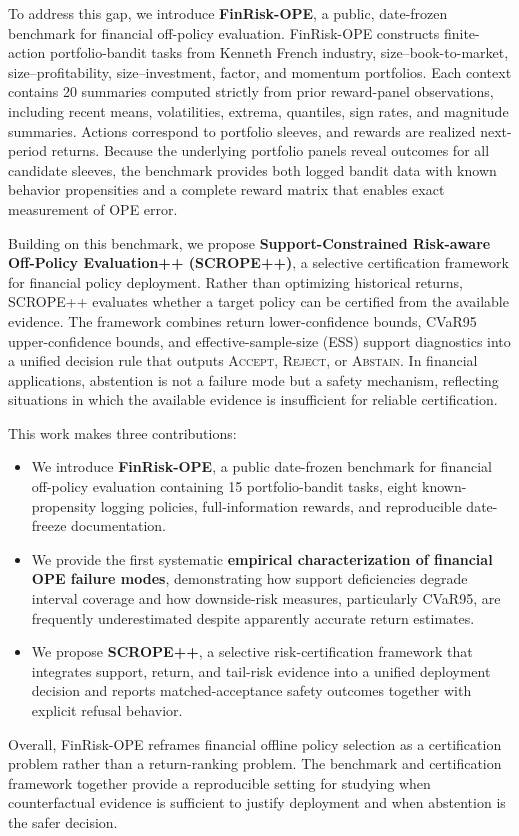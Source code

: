 \documentclass[conference]{IEEEtran}
\begin{document}
To address this gap, we introduce \textbf{FinRisk-OPE}, a public, date-frozen benchmark for financial off-policy evaluation. FinRisk-OPE constructs finite-action portfolio-bandit tasks from Kenneth French industry, size--book-to-market, size--profitability, size--investment, factor, and momentum portfolios. Each context contains 20 summaries computed strictly from prior reward-panel observations, including recent means, volatilities, extrema, quantiles, sign rates, and magnitude summaries. Actions correspond to portfolio sleeves, and rewards are realized next-period returns. Because the underlying portfolio panels reveal outcomes for all candidate sleeves, the benchmark provides both logged bandit data with known behavior propensities and a complete reward matrix that enables exact measurement of OPE error.

Building on this benchmark, we propose \textbf{Support-Constrained Risk-aware Off-Policy Evaluation++ (SCROPE++)}, a selective certification framework for financial policy deployment. Rather than optimizing historical returns, SCROPE++ evaluates whether a target policy can be certified from the available evidence. The framework combines return lower-confidence bounds, CVaR95 upper-confidence bounds, and effective-sample-size (ESS) support diagnostics into a unified decision rule that outputs \textsc{Accept}, \textsc{Reject}, or \textsc{Abstain}. In financial applications, abstention is not a failure mode but a safety mechanism, reflecting situations in which the available evidence is insufficient for reliable certification.

This work makes three contributions:

\begin{itemize}
\item We introduce \textbf{FinRisk-OPE}, a public date-frozen benchmark for financial off-policy evaluation containing 15 portfolio-bandit tasks, eight known-propensity logging policies, full-information rewards, and reproducible date-freeze documentation.
\item We provide the first systematic \textbf{empirical characterization of financial OPE failure modes}, demonstrating how support deficiencies degrade interval coverage and how downside-risk measures, particularly CVaR95, are frequently underestimated despite apparently accurate return estimates.

\item We propose \textbf{SCROPE++}, a selective risk-certification framework that integrates support, return, and tail-risk evidence into a unified deployment decision and reports matched-acceptance safety outcomes together with explicit refusal behavior.

\end{itemize}
Overall, FinRisk-OPE reframes financial offline policy selection as a certification problem rather than a return-ranking problem. The benchmark and certification framework together provide a reproducible setting for studying when counterfactual evidence is sufficient to justify deployment and when abstention is the safer decision.
\end{document}
